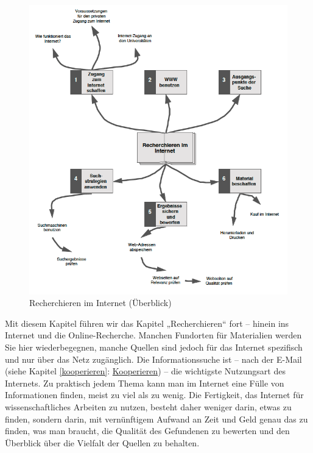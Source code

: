\documentclass[]{book}
\theoremstyle{definition}
\theoremstyle{definition}
\theoremstyle{definition}
\theoremstyle{remark}
\begin{document}
\begin{figure}

{\centering \includegraphics{images/recherchieren-internet-min} 

}

\caption{Recherchieren im Internet (Überblick)}\label{fig:unnamed-chunk-11}
\end{figure}

Mit diesem Kapitel führen wir das Kapitel „Recherchieren`` fort --
hinein ins Internet und die Online-Recherche. Manchen Fundorten für
Materialien werden Sie hier wiederbegegnen, manche Quellen sind jedoch
für das Internet spezifisch und nur über das Netz zugänglich. Die
Informationssuche ist -- nach der E-Mail (siehe Kapitel
\ref{kooperieren}: \protect\hyperlink{kooperieren}{Kooperieren}) -- die
wichtigste Nutzungsart des Internets. Zu praktisch jedem Thema kann man
im Internet eine Fülle von Informationen finden, meist zu viel als zu
wenig. Die Fertigkeit, das Internet für wissenschaftliches Arbeiten zu
nutzen, besteht daher weniger darin, etwas zu finden, sondern darin, mit
vernünftigem Aufwand an Zeit und Geld genau das zu finden, was man
braucht, die Qualität des Gefundenen zu bewerten und den Überblick über
die Vielfalt der Quellen zu behalten.
\end{document}
